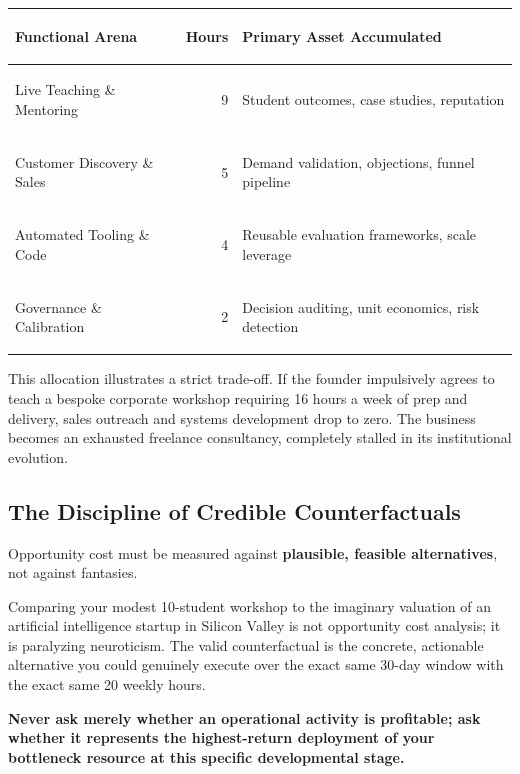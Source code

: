 \begin{tcolorbox}[
  enhanced,
  colback=BayesSurface!60,
  colframe=BayesBorder,
  boxrule=0.5pt,
  arc=3pt,
  left=3pt,right=3pt,top=3pt,bottom=3pt,
  boxsep=1pt
]
\scriptsize
\begin{tabularx}{\linewidth}{>{\bfseries\raggedright\arraybackslash}p{2.3cm} r X}
\toprule
\textbf{Functional Arena} & \textbf{Hours} & \textbf{Primary Asset Accumulated} \\
\midrule
Live Teaching \& Mentoring & 9 & Student outcomes, case studies, reputation \\
\addlinespace[2pt]
Customer Discovery \& Sales & 5 & Demand validation, objections, funnel pipeline \\
\addlinespace[2pt]
Automated Tooling \& Code & 4 & Reusable evaluation frameworks, scale leverage \\
\addlinespace[2pt]
Governance \& Calibration & 2 & Decision auditing, unit economics, risk detection \\
\bottomrule
\end{tabularx}
\end{tcolorbox}

This allocation illustrates a strict trade-off. If the founder impulsively agrees to teach a bespoke corporate workshop requiring 16 hours a week of prep and delivery, sales outreach and systems development drop to zero. The business becomes an exhausted freelance consultancy, completely stalled in its institutional evolution.

\subsection{The Discipline of Credible Counterfactuals}

Opportunity cost must be measured against \textbf{plausible, feasible alternatives}, not against fantasies.

Comparing your modest 10-student workshop to the imaginary valuation of an artificial intelligence startup in Silicon Valley is not opportunity cost analysis; it is paralyzing neuroticism. The valid counterfactual is the concrete, actionable alternative you could genuinely execute over the exact same 30-day window with the exact same 20 weekly hours.

\textbf{Never ask merely whether an operational activity is profitable; ask whether it represents the highest-return deployment of your bottleneck resource at this specific developmental stage.}
